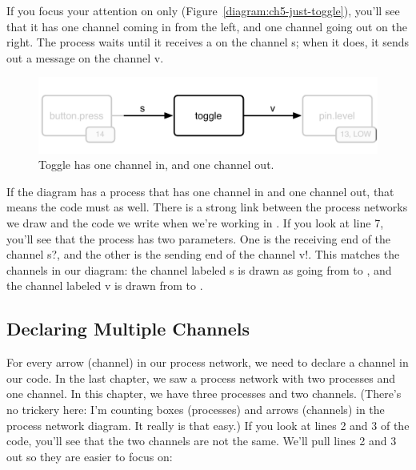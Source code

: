 
If you focus your attention on \toggle only (Figure~\vref{diagram:ch5-just-toggle}), you'll see that it has one channel coming in from the left, and one channel going out on the right. The \toggle process waits until it receives a \SIGNALV on the channel {\code s}; when it does, it sends out a message on the channel {\code v}. 

\begin{figure}[h]
  \begin{center}
    \includegraphics[width=\linewidth]{images/ch5-just-toggle}
    \caption{Toggle has one channel in, and one channel out.}
    \label{diagram:ch5-just-toggle}
  \end{center}
\end{figure}

If the diagram has a process that has one channel in and one channel out, that means the code must as well. There is a strong link between the process networks we draw and the code we write when we're working in \plumbing. If you look at line 7, you'll see that the process \toggle has two parameters. One is the receiving end of the channel {\code s?}, and the other is the sending end of the channel {\code v!}. This matches the channels in our diagram: the channel labeled {\code s} is drawn as going from \bp to \toggle, and the channel labeled {\code v} is drawn from \toggle to \digo.

\subsection{Declaring Multiple Channels}
For every arrow (channel) in our process network, we need to declare a channel in our code. In the last chapter, we saw a process network with two processes and one channel. In this chapter, we have three processes and two channels. (There's no trickery here: I'm counting boxes (processes) and arrows (channels) in the process network diagram. It really is that easy.) If you look at lines 2 and 3 of the code, you'll see that the two channels are not the same. We'll pull lines 2 and 3 out so they are easier to focus on:

